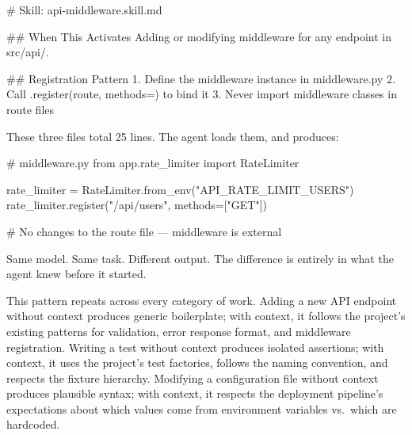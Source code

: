 \documentclass[
  a4paper,
  DIV=11,
  numbers=noendperiod]{scrreprt}
\newenvironment{Shaded}{\begin{snugshade}}{\end{snugshade}}
\newcommand{\CommentTok}[1]{\textcolor[rgb]{0.37,0.37,0.37}{#1}}
\newcommand{\FunctionTok}[1]{\textcolor[rgb]{0.28,0.35,0.67}{#1}}
\newcommand{\ImportTok}[1]{\textcolor[rgb]{0.00,0.46,0.62}{#1}}
\newcommand{\InformationTok}[1]{\textcolor[rgb]{0.37,0.37,0.37}{#1}}
\newcommand{\NormalTok}[1]{\textcolor[rgb]{0.00,0.23,0.31}{#1}}
\newcommand{\OperatorTok}[1]{\textcolor[rgb]{0.37,0.37,0.37}{#1}}
\newcommand{\SpecialStringTok}[1]{\textcolor[rgb]{0.13,0.47,0.30}{#1}}
\newcommand{\StringTok}[1]{\textcolor[rgb]{0.13,0.47,0.30}{#1}}
\begin{document}
\begin{Shaded}
\begin{Highlighting}[]
\FunctionTok{\# Skill: api{-}middleware.skill.md}

\FunctionTok{\#\# When This Activates}
\NormalTok{Adding or modifying middleware for any endpoint in }\InformationTok{\textasciigrave{}src/api/\textasciigrave{}}\NormalTok{.}

\FunctionTok{\#\# Registration Pattern}
\SpecialStringTok{1. }\NormalTok{Define the middleware instance in }\InformationTok{\textasciigrave{}middleware.py\textasciigrave{}}
\SpecialStringTok{2. }\NormalTok{Call }\InformationTok{\textasciigrave{}.register(route, methods=)\textasciigrave{}}\NormalTok{ to bind it}
\SpecialStringTok{3. }\NormalTok{Never import middleware classes in route files}
\end{Highlighting}
\end{Shaded}

These three files total 25 lines. The agent loads them, and produces:

\begin{Shaded}
\begin{Highlighting}[]
\CommentTok{\# middleware.py}
\ImportTok{from}\NormalTok{ app.rate\_limiter }\ImportTok{import}\NormalTok{ RateLimiter}

\NormalTok{rate\_limiter }\OperatorTok{=}\NormalTok{ RateLimiter.from\_env(}\StringTok{"API\_RATE\_LIMIT\_USERS"}\NormalTok{)}
\NormalTok{rate\_limiter.register(}\StringTok{"/api/users"}\NormalTok{, methods}\OperatorTok{=}\NormalTok{[}\StringTok{"GET"}\NormalTok{])}
\end{Highlighting}
\end{Shaded}

\begin{Shaded}
\begin{Highlighting}[]
\CommentTok{\# No changes to the route file — middleware is external}
\end{Highlighting}
\end{Shaded}

Same model. Same task. Different output. The difference is entirely in
what the agent knew before it started.

This pattern repeats across every category of work. Adding a new API
endpoint without context produces generic boilerplate; with context, it
follows the project's existing patterns for validation, error response
format, and middleware registration. Writing a test without context
produces isolated assertions; with context, it uses the project's test
factories, follows the naming convention, and respects the fixture
hierarchy. Modifying a configuration file without context produces
plausible syntax; with context, it respects the deployment pipeline's
expectations about which values come from environment variables
vs.~which are hardcoded.
\end{document}
